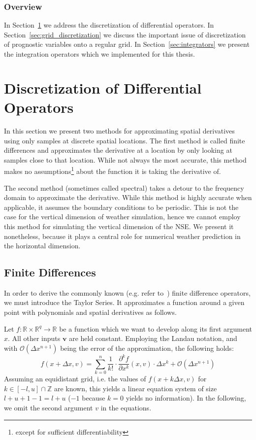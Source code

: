 \subsubsection{Overview}
In Section~\ref{section:diff_op} we address the discretization of differential operators.
In Section~\ref{sec:grid_discretization} we discuss the important issue of discretization of prognostic variables onto a regular grid.
In Section~\ref{sec:integrators} we present the integration operators which we implemented for this thesis.

\section{Discretization of Differential Operators}\label{section:diff_op}
In this section we present two methods for approximating spatial derivatives using only samples at discrete spatial locations.
The first method is called finite differences and approximates the derivative at a location by only looking at samples close to that location.
While not always the most accurate, this method makes no assumptions\footnote{except for sufficient differentiability} about the function it is taking the derivative of.

The second method (sometimes called spectral) takes a detour to the frequency domain to approximate the derivative.
While this method is highly accurate when applicable, it assumes the boundary conditions to be periodic.
This is not the case for the vertical dimension of weather simulation, hence we cannot employ this method for simulating the vertical dimension of the NSE.
We present it nonetheless, because it plays a central role for numerical weather prediction in the horizontal dimension.

\subsection{Finite Differences}
In order to derive the commonly known (e.g. refer to~\cite{smith1985numerical}) finite difference operators, we must introduce the Taylor Series.
It approximates a function around a given point with polynomials and spatial derivatives as follows.

Let $f:\mathbb{R}\times\mathbb{R}^q\rightarrow \mathbb{R}$ be a function which we want to develop along its first argument $x$.
All other inputs $\boldsymbol{v}$ are held constant.
Employing the Landau notation, and with $\mathcal{O}(\Delta x ^{n+1})$ being the error of the approximation, the following holds:
\begin{equation}
f(x+\Delta x,v) = \sum_{k=0}^{n}\frac{1}{k!}\cdot\frac{\partial^k f}{\partial x ^k}(x,v)\cdot \Delta x^k + \mathcal{O}(\Delta x ^{n+1})
\end{equation}
Assuming an equidistant grid, i.e. the values of $f(x+k\Delta x,v)$ for $k\in [-l,u] \cap \mathbb{Z}$ are known, this yields a linear equation system of size $l + u + 1 - 1= l + u$ ($-1$ because $k=0$ yields no information).
In the following, we omit the second argument $v$ in the equations.

